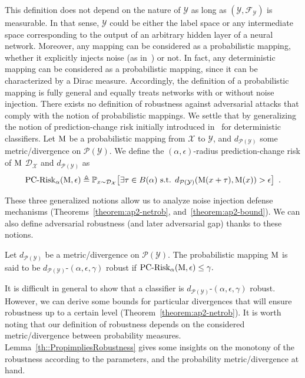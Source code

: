 This definition does not depend on the nature of $\mathcal{Y}$ as long as $(\mathcal{Y},\mathcal{F}_{\mathcal{Y}})$ is measurable.
In that sense, $\mathcal{Y}$ could be either the label space or any intermediate space corresponding to the output of an arbitrary hidden layer of a neural network.
Moreover, any mapping can be considered as a probabilistic mapping, whether it explicitly injects noise (as in~\cite{lecuyer2018certified,rakin2018parametricnoiseinjection,pruningDefenseICLR2018}) or not.
In fact, any deterministic mapping can be considered as a probabilistic mapping, since it can be characterized by a Dirac measure.
Accordingly, the definition of a probabilistic mapping is fully general and equally treats networks with or without noise injection.
There exists no definition of robustness against adversarial attacks that comply with the notion of probabilistic mappings.
We settle that by generalizing the notion of prediction-change risk initially introduced in~\cite{NIPS2018Mahloujifar} for deterministic classifiers.
Let $\operatorname*{M}$ be a probabilistic mapping from $\mathcal{X}$ to $\mathcal{Y}$, and $d_{\mathcal{P}(\mathcal{Y})}$ some metric/divergence on $\mathcal{P}(\mathcal{Y})$.
We define the $(\alpha,\epsilon)$-radius prediction-change risk of $\operatorname*{M}$ \wrt $\mathcal{D}_{\mathcal{X}}$ and $d_{\mathcal{P}(\mathcal{Y})}$ as 
\begin{equation}
  \PCadvRisk(\probmap,\epsilon) \triangleq  \mathbb{P}_{x\sim \mathcal{D}_{\mathcal{X}}}\left[ \exists \tau \in B(\alpha) \text{ s.t. } d_{\mathcal{P}(\mathcal{Y})}(\probmap(x+\tau),\probmap(x)) > \epsilon \right] \enspace.
\end{equation}

These three generalized notions allow us to analyze noise injection defense mechanisms (Theorems~\ref{theorem:ap2-netrob}, and~\ref{theorem:ap2-bound}).
We can also define adversarial robustness (and later adversarial gap) thanks to these notions. 

\begin{definition}
  Let $d_{\mathcal{P}(\mathcal{Y})}$ be a metric/divergence on $\mathcal{P}(\mathcal{Y})$.
  The probabilistic mapping $\operatorname*{M}$ is said to be $d_{\mathcal{P}(\mathcal{Y})}$-$(\alpha, \epsilon, \gamma)$ robust if $\operatorname*{PC-Risk_{\alpha}}(\operatorname*{M},\epsilon) \leq \gamma.$ 
  \label{def::GeneralizedRobustness}
\end{definition}

It is difficult in general to show that a classifier is $d_{\mathcal{P}(\mathcal{Y})}$-$(\alpha, \epsilon, \gamma)$ robust.
However, we can  derive some bounds for particular divergences that will ensure robustness up to a certain level (Theorem~\ref{theorem:ap2-netrob}).
It is worth noting that our definition of robustness depends on the considered metric/divergence between probability measures.
Lemma~\ref{th::PropimpliesRobustness} gives some insights on the monotony of the robustness according to the parameters, and the probability metric/divergence at hand.

